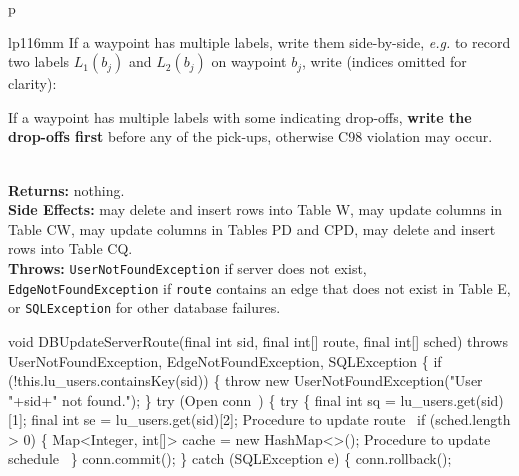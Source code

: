 \begin{tabular}{p{\textwidth}}
\begin{tabular}{lp{116mm}}
If a waypoint has multiple labels, write them side-by-side, \textit{e.g.}
to record two labels $L_1(b_j)$ and $L_2(b_j)$ on waypoint $b_j$, write
(indices omitted for clarity):


If a waypoint has multiple labels with some indicating drop-offs, \textbf{write
the drop-offs first} before any of the pick-ups, otherwise C98 violation may
occur.
\end{tabular}\\
\textbf{Returns:} nothing.\\
\textbf{Side Effects:} may delete and insert rows into Table W, may
update columns in Table CW, may update columns in Tables PD and CPD,
may delete and insert rows into Table CQ.\\
\textbf{Throws:} {\tt{}UserNotFoundException} if server does not exist,
{\tt{}EdgeNotFoundException} if {\tt{}route} contains an edge that does not exist
in Table E, or {\tt{}SQLException} for other database failures.\\
\bottomrule
\end{tabular}
\nwenddocs{}\endmoddef{}
void DBUpdateServerRoute(final int sid, final int[] route, final int[] sched)
throws UserNotFoundException, EdgeNotFoundException, SQLException \{
  if (!this.lu_users.containsKey(sid)) \{
    throw new UserNotFoundException("User "+sid+" not found.");
  \}
  try (\LA{}Open \code{}conn\edoc{}~{\nwtagstyle{}}\RA{}) \{
    try \{
      final int sq = lu_users.get(sid)[1];
      final int se = lu_users.get(sid)[2];
      \LA{}Procedure to update route~{\nwtagstyle{}}\RA{}
      if (sched.length > 0) \{
        Map<Integer, int[]> cache = new HashMap<>();
        \LA{}Procedure to update schedule~{\nwtagstyle{}}\RA{}
      \}
      conn.commit();
    \} catch (SQLException e) \{
      conn.rollback();
